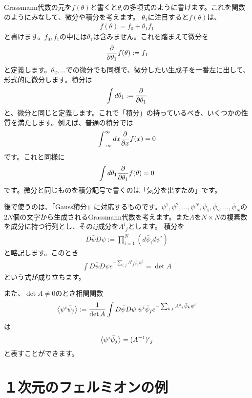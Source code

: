 \documentclass[paper=a4, fontsize=12pt, line_length=16cm, number_of_lines=33,dvipdfmx]{jlreq}
\numberwithin{equation}{section}
\newcommand{\psib}{\bar{\psi}}
\begin{document}
Grassmann代数の元を$f(\theta)$と書くと$\theta_i$の多項式のように書けます。これを関数のようにみなして、微分や積分を考えます。
$\theta_1$に注目すると$f(\theta)$は、
\begin{align}
  f(\theta)=f_0+\theta_1f_1
\end{align}
と書けます。$f_0,f_1$の中には$\theta_1$は含みません。これを踏まえて微分を
\begin{align}
  \pdv{\theta_1}f(\theta):=f_1
\end{align}
と定義します。$\theta_2,\dots$での微分でも同様で、微分したい生成子を一番左に出して、形式的に微分します。積分は
\begin{align}
  \int d\theta_1:=\pdv{\theta_1}
\end{align}
と、微分と同じと定義します。これで「積分」の持っているべき、いくつかの性質を満たします。例えば、普通の積分では
\begin{align}
  \int_{-\infty}^{\infty}dx \pdv{x} f(x)=0
\end{align}
です。これと同様に
\begin{align}
  \int d\theta_1 \pdv{\theta_1}f(\theta)=0
\end{align}
です。微分と同じものを積分記号で書くのは「気分を出すため」です。

後で使うのは、「Gauss積分」に対応するものです。$\psi^1,\psi^2,\dots,\psi^N,\psib_1,\psib_2,\dots,\psib_N$の$2N$個の文字から生成されるGrassmann代数を考えます。また$A$を$N\times N$の複素数を成分に持つ行列とし、その$ij$成分を$A^{i}{}_{j}$とします。
積分を
\begin{align}
  D\psib D\psi:=\prod_{i=1}^{N}(d\psib_i d\psi^i)
\end{align}
と略記します。このとき
\begin{align}
  \int D\psib D\psi e^{-\sum_{i,j}A^{i}{}_{j}\psib_i\psi^{j}}
  =\det A
  \label{finitefermiondet}
\end{align}
という式が成り立ちます。

また、$\det A\ne 0$のとき相関関数
\begin{align}
  \expval{\psi^{i}\psib_{j}}:=\frac{1}{\det A}\int D\psib D\psi\; \psi^{i}\psib_{j} e^{-\sum_{k,l}A^{k}{}_{l}\psib_k\psi^{l}}
\end{align}
は
\begin{align}
  \expval{\psi^{i}\psib_{j}}=(A^{-1})^{i}{}_{j}\label{fermion2pt}
\end{align}
と表すことができます。

\section{１次元のフェルミオンの例}
\label{1dfermion}
\end{document}
